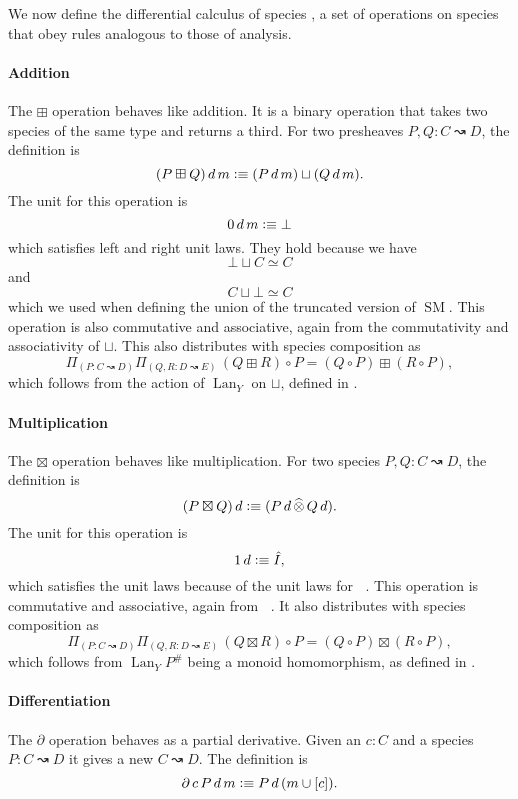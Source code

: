 \documentclass[12pt, parskip, DIV=14]{scrbook}
\newcommand{\defeq}{\vcentcolon\equiv}
\renewcommand{\circ}{\vysmwhtcircle}
\newcommand{\SM}{\operatorname{SM}}
\DeclareMathOperator\daytensor{\widehat\otimes}
\newcommand{\Lan}{\operatorname{Lan}}
\newcommand{\spec}[2]{#1 \rightwavearrow #2}
\begin{document}
We now define the differential calculus of species \citep{fiore2005mathematical}, a set of operations on species that obey rules analogous to those of analysis.

\paragraph{Addition} The $\boxplus$ operation behaves like addition. It is a binary operation that takes two species of the same type and returns a third. For two presheaves $P , Q : \spec{C}{D}$, the definition is
$$(P \boxplus Q)\,d\,m \defeq (P\,d\,m) \sqcup (Q\,d\,m).$$
The unit for this operation is
$$0\,d\,m \defeq \bot$$
which satisfies left and right unit laws. They hold because we have
$$\bot \sqcup C \simeq C$$
and
$$C \sqcup \bot \simeq C$$
which we used when defining the union of the truncated version of $\SM$. This operation is also commutative and associative, again from the commutativity and associativity of $\sqcup$. This also distributes with species composition as
$$\Pi_{(P : \spec{C}{D})}\Pi_{(Q , R : \spec{D}{E})}\,(Q \boxplus R) \circ P = (Q \circ P) \boxplus (R \circ P),$$
which follows from the action of $\Lan_Y$ on $\sqcup$, defined in .

\paragraph{Multiplication} The $\boxtimes$ operation behaves like multiplication. For two species $P , Q : \spec{C}{D}$, the definition is
$$(P \boxtimes Q)\,d \defeq (P\,d \daytensor Q\,d).$$
The unit for this operation is
$$1\,d \defeq \hat{I},$$
which satisfies the unit laws because of the unit laws for $\daytensor$. This operation is commutative and associative, again from $\daytensor$. It also distributes with species composition as
$$\Pi_{(P : \spec{C}{D})}\Pi_{(Q , R : \spec{D}{E})}\,(Q \boxtimes R) \circ P = (Q \circ P) \boxtimes (R \circ P),$$ which follows from $\Lan_Y P^\#$ being a monoid homomorphism, as defined in .


\paragraph{Differentiation} The $\partial$ operation behaves as a partial derivative. Given an $c : C$ and a species $P : \spec{C}{D}$ it gives a new $\spec{C}{D}$. The definition is
$$\partial\,c\,P\,d\,m \defeq P\,d\,(m \cup [c]).$$
\end{document}
